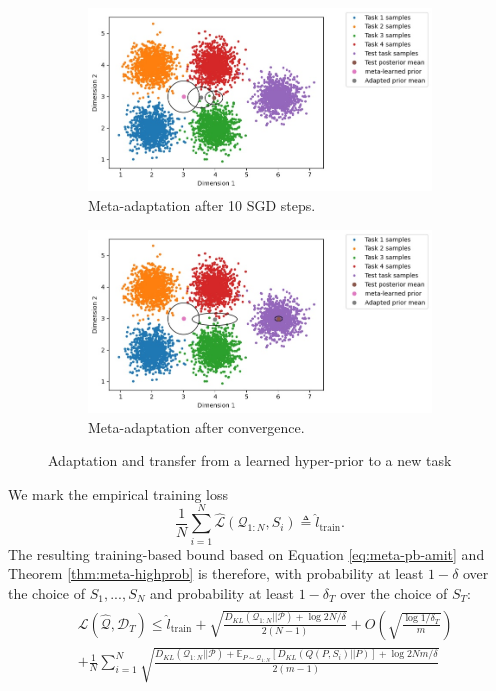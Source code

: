 \documentclass{article}
\theoremstyle{definition}
\newcommand{\Expect}[2]{\mathbb{E}_{#1}\left [#2 \right ]}
\begin{document}
\begin{figure}[h!]
	\centering
	\begin{subfigure}[b]{0.49\textwidth}
		\centering
		\includegraphics[width=\textwidth]{toy_example_aml_mid.JPG}
		\caption{Meta-adaptation after 10 SGD steps.}
	\end{subfigure}
	\hfill
	\begin{subfigure}[b]{0.49\textwidth}
		\centering
		\includegraphics[width=\textwidth]{toy_example_aml_fin.JPG}
		\caption{Meta-adaptation after convergence.}	 	
	\end{subfigure}
	\hfill
	\caption{Adaptation and transfer from a learned hyper-prior to a new task}	 
	\label{fig:ex-aml}
\end{figure}

We mark the empirical training loss $$\frac{1}{N}\sum_{i=1}^{N}\hat{\mathcal{L}}(\mathcal{Q}_{1:N},S_i)\triangleq \hat{l}_{\mathrm{train}}.$$
The resulting training-based bound based on Equation \ref{eq:meta-pb-amit} and Theorem \ref{thm:meta-highprob} is therefore, with probability at least $1-\delta$ over the choice of $S_1,...,S_N$ and probability at least $1-\delta_T$ over the choice of $S_T$:
\begin{align} \label{eq:comparison-bound-base}
\begin{split}
&\mathcal{L}(\hat{\mathcal{Q}},\mathcal{D}_T)\leq \hat{l}_{\mathrm{train}} + \sqrt{\frac{D_{KL}(\mathcal{Q}_{1:N}||\mathcal{P})+\log2N/\delta}{2(N-1)}}
+O\left (\sqrt{\frac{\log{1/\delta_T}}{m}}\right ) \\
&+\frac{1}{N}\sum_{i=1}^{N}\sqrt{\frac{D_{KL}(\mathcal{Q}_{1:N}||\mathcal{P})+\Expect{P\sim \mathcal{Q}_{1:N}}{D_{KL}(Q(P,S_i)||P)}+\log{2Nm/\delta}}{2(m-1)}}
\end{split}
\end{align}
\end{document}
